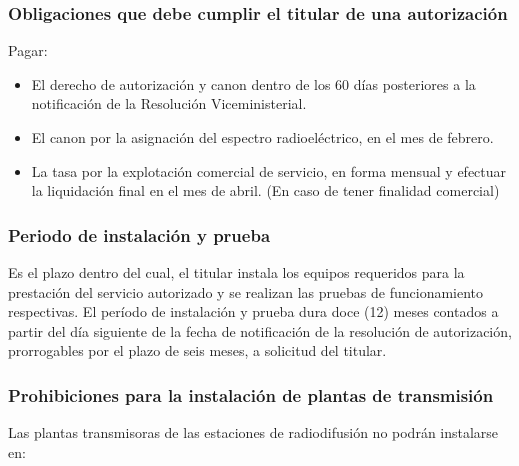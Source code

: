 \documentclass[a4paper]{IEEEtran} %
\begin{document}
\subsubsection{Obligaciones que debe cumplir el titular de una autorización}
Pagar:
\begin{itemize}
	\item El  derecho  de  autorización  y  canon  dentro  de 
	los  60  días  posteriores  a  la  notificación  de  la 
	Resolución Viceministerial. 
	\item El canon por la asignación del espectro 
	radioeléctrico, en el mes de febrero. 
	\item La tasa por la explotación comercial de 
	servicio, en forma mensual y efectuar la 
	liquidación  final  en  el  mes  de  abril.  (En  caso  de 
	tener finalidad comercial)
\end{itemize}

\subsubsection{Periodo de instalación y prueba}
Es  el  plazo  dentro  del  cual,  el  titular  instala  los 
equipos requeridos para la prestación del servicio 
autorizado y se realizan las pruebas de 
funcionamiento respectivas. El período de instalación y prueba dura doce (12) 
meses  contados  a  partir  del  día  siguiente  de  la 
fecha de notificación de la resolución de 
autorización,  prorrogables  por  el  plazo  de  seis 
meses, a solicitud del titular. 

\subsubsection{Prohibiciones para la instalación de plantas de transmisión}

Las  plantas  transmisoras  de  las  estaciones  de 
radiodifusión no podrán instalarse en:
\end{document}
